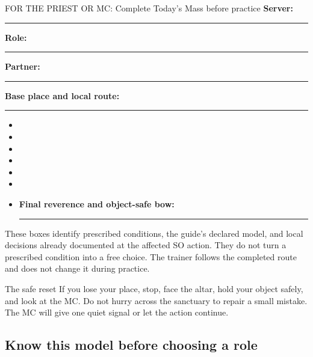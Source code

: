 \begin{coachbox}{FOR THE PRIEST OR MC: Complete Today's Mass before practice}
\textbf{Server:} \rule{0.31\linewidth}{0.4pt}\quad
\textbf{Role:} \rule{0.22\linewidth}{0.4pt}\quad
\textbf{Partner:} \rule{0.19\linewidth}{0.4pt}

\textbf{Base place and local route:} \rule{0.66\linewidth}{0.4pt}

\begin{itemize}[leftmargin=1.5em]
\item {}\quad
\item {}\quad
      \quad
\item {}\quad
      \quad
\item {}\quad
\item {}\quad
      \quad
\item {}\quad {}
\item \textbf{Final reverence and object-safe bow:}
      \rule{0.53\linewidth}{0.4pt}
\end{itemize}
These boxes identify prescribed conditions, the guide's declared model, and
local decisions already documented at the affected SO action.  They do not
turn a prescribed condition into a free choice.
The trainer follows the completed route and does not change it during practice.
\end{coachbox}

\Needspace{0.14\textheight}
\begin{learnerbox}{The safe reset}
If you lose your place, stop, face the altar, hold your object safely, and look
at the MC.  Do not hurry across the sanctuary to repair a small mistake.  The
MC will give one quiet signal or let the action continue.
\end{learnerbox}

\subsection{Know this model before choosing a role}

